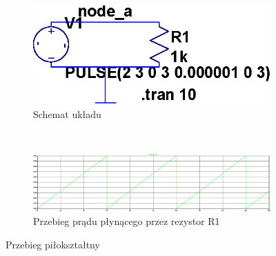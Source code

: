 \documentclass[polish,polish,a4paper]{article}
\begin{document}
\begin{figure}[H]
    \centering
    
    \begin{subfigure}[b]{0.4\textwidth}
    	\centering
        \includegraphics[width=\textwidth]{piloksztaltnyuklad.eps}
        \caption{Schemat układu}
    \end{subfigure}
    ~
     \begin{subfigure}[b]{0.4\textwidth}
     	\centering
         \includegraphics[width=\textwidth]{piloksztaltny.eps}
         \caption{Przebieg prądu płynącego przez rezystor R1}
     \end{subfigure}
     \caption{Przebieg piłokształtny}
\end{figure}
\end{document}
